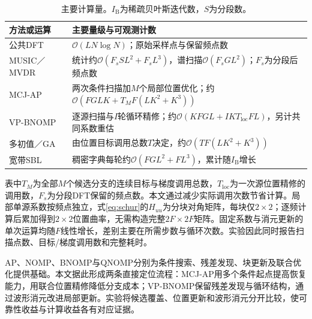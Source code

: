 \begin{table}[pos=htbp]
\centering\small
\caption{主要计算量。$I_{\mathrm B}$为稀疏贝叶斯迭代数，$S$为分段数。}\label{tab:complexity}
\begin{tabularx}{\linewidth}{@{}lX@{}}\toprule
方法或运算 & 主要量级与可观测计数\\\midrule
公共DFT & $\mathcal O(LN\log N)$；原始采样点与保留频点数\\
MUSIC／MVDR & 统计约$\mathcal O(F_sSL^2+F_sL^3)$，谱扫描$\mathcal O(F_sGL^2)$；$F_s$为分段后频点数\\
MCJ-AP & 两次条件扫描加$M$个局部位置优化；约$\mathcal O(FGLK+T_MF(LK^2+K^3))$\\
VP-BNOMP & 逐源扫描与$I$轮循环精修；约$\mathcal O(KFGL+IKT_{\mathrm{loc}}FL)$，另计共同系数重估\\
多初值／GA & 由位置目标调用总数$T$决定，约$\mathcal O(TF(LK^2+K^3))$\\
宽带SBL & 稠密字典每轮约$\mathcal O(FGL^2+FL^3)$，累计随$I_{\mathrm B}$增长\\\bottomrule
\end{tabularx}
\end{table}
表中$T_M$为全部$M$个候选分支的连续目标与梯度调用总数，$T_{\mathrm{loc}}$为一次源位置精修的调用数，$F_s$为分段DFT保留的频点数。本文通过减少实际调用次数节省计算。局部单源系数按频点独立，式\eqref{eq:schur}的$H_{uu}$为分块对角矩阵，每块仅$2\times2$；逐频计算后累加得到$2\times2$位置曲率，无需构造完整$2F\times2F$矩阵。固定系数与消元更新的单次运算均随$F$线性增长，差别主要在所需步数与循环次数。实验因此同时报告扫描点数、目标/梯度调用数和完整耗时。

AP、NOMP、BNOMP与QNOMP分别为条件搜索、残差发现、块更新及联合优化提供基础\cite{ChenHudsonYao2002,Mamandipoor2016,Yang2022,Zeng2025}。本文据此形成两条直接定位流程：MCJ-AP用多个条件起点提高恢复能力，用联合位置精修降低分支成本；VP-BNOMP保留残差发现与循环结构，通过波形消元改进局部更新。实验将候选覆盖、位置更新和波形消元分开比较，使可靠性收益与计算收益各有对应证据。
